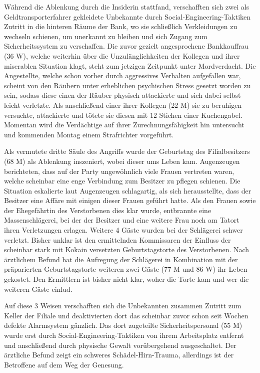 \documentclass[final]{multiversum}
\begin{document}
Während die Ablenkung durch die Insiderin stattfand, verschafften sich zwei als
Geldtransporterfahrer gekleidete Unbekannte durch Social-Engineering-Taktiken
Zutritt in die hinteren Räume der Bank, wo sie schließlich Verkleidungen zu
wechseln schienen, um unerkannt zu bleiben und sich Zugang zum Sicherheitssystem
zu verschaffen. Die zuvor gezielt angesprochene Bankkauffrau (36 W), welche
weiterhin über die Unzulänglichkeiten der Kollegen und ihrer miserablen
Situation klagt, steht zum jetzigen Zeitpunkt unter Mordverdacht. Die
Angestellte, welche schon vorher durch aggressives Verhalten aufgefallen war,
scheint von den Räubern unter erheblichen psychischen Stress gesetzt worden zu
sein, sodass diese einen der Räuber physisch attackierte und sich dabei selbst
leicht verletzte. Als anschließend einer ihrer Kollegen (22 M) sie zu beruhigen
versuchte, attackierte und tötete sie diesen mit 12 Stichen einer Kuchengabel.
Momentan wird die Verdächtige auf ihrer Zurechnungsfähigkeit hin untersucht und
kommenden Montag einem Strafrichter vorgeführt.

Als vermutete dritte Säule des Angriffs wurde der Geburtstag des Filialbesitzers
(68 M) als Ablenkung inszeniert, wobei dieser ums Leben kam. Augenzeugen
berichteten, dass auf der Party ungewöhnlich viele Frauen vertreten waren,
welche scheinbar eine enge Verbindung zum Besitzer zu pflegen schienen. Die
Situation eskalierte laut Augenzeugen schlagartig, als sich herausstellte, dass
der Besitzer eine Affäre mit einigen dieser Frauen geführt hatte. Als den
Frauen sowie der Ehegefährtin des Verstorbenen dies klar wurde, entbrannte
eine Massenschlägerei, bei der der Besitzer und eine weitere Frau noch am Tatort
ihren Verletzungen erlagen. Weitere 4 Gäste wurden bei der Schlägerei schwer
verletzt. Bisher unklar ist den ermittelnden Kommissaren der Einfluss der
scheinbar stark mit Kokain versetzten Geburtstagstorte des Verstorbenen. Nach
ärztlichem Befund hat die Aufregung der Schlägerei in Kombination mit der
präparierten Geburtstagstorte weiteren zwei Gäste (77 M und 86 W) ihr Leben
gekostet. Den Ermittlern ist bisher nicht klar, woher die Torte kam und wer die
weiteren Gäste einlud.

Auf diese 3 Weisen verschafften sich die Unbekannten zusammen Zutritt zum Keller
der Filiale und deaktivierten dort das scheinbar zuvor schon seit Wochen defekte
Alarmsystem gänzlich. Das dort zugeteilte Sicherheitspersonal (55 M) wurde erst
durch Social-Engineering-Taktiken von ihrem Arbeitsplatz entfernt und
anschließend durch physische Gewalt vorübergehend ausgeschaltet. Der ärztliche
Befund zeigt ein schweres Schädel-Hirn-Trauma, allerdings ist der Betroffene auf
dem Weg der Genesung.
\end{document}
